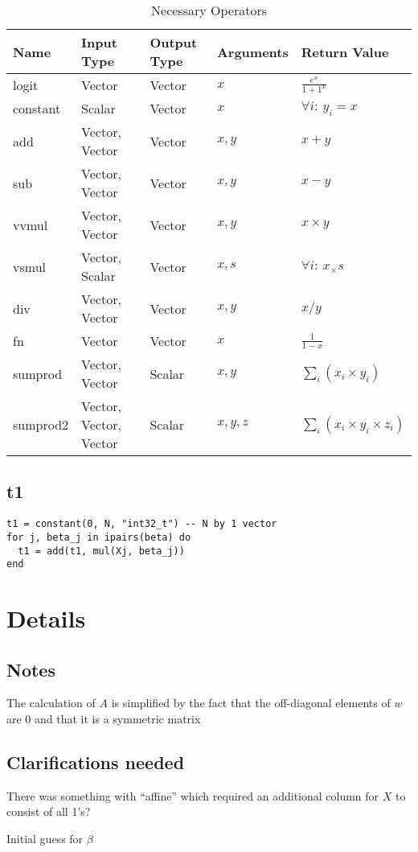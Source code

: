 \documentclass[12pt,timesnewroman,letterpaper]{article}
\begin{document}
\begin{table}[hb]
\centering
\begin{tabular}{|l|l|l|l|l|} \hline \hline
  {\bf Name} & {\bf Input Type} & {\bf Output Type} & {\bf Arguments} & {\bf Return Value} \\ \hline \hline
  logit & Vector & Vector & \(x\) & \(\frac{e^x}{1 + 1^x}\) \\ \hline
  constant & Scalar & Vector & \(x\) & \(\forall i:~ y_i = x \) \\ \hline
  add & Vector, Vector & Vector & \(x, y\) & \(x + y \)  \\ \hline
  sub & Vector, Vector & Vector & \(x, y\) & \(x - y \)  \\ \hline
  vvmul & Vector, Vector & Vector & \(x, y\) & \(x \times y \)  \\ \hline
  vsmul & Vector, Scalar & Vector & \(x, s\) & \(\forall i:~x_ \times s \)  \\ \hline
  div & Vector, Vector & Vector & \(x, y\) & \(x / y \)  \\ \hline
  fn & Vector & Vector & \(x\) & \(\frac{1}{1 - x}\) \\ \hline
  sumprod & Vector, Vector & Scalar & \(x, y\) & \(\sum_i (x_i \times y_i)\) \\ \hline
  sumprod2 & Vector, Vector, Vector & Scalar & \(x, y, z\) & \(\sum_i (x_i \times y_i \times z_i)\) \\ \hline
\hline
\end{tabular}
\caption{Necessary Operators}
\label{tbl_custom_ops}
\end{table}

\subsection{t1}
\label{t1}

\begin{verbatim}
t1 = constant(0, N, "int32_t") -- N by 1 vector 
for j, beta_j in ipairs(beta) do
  t1 = add(t1, mul(Xj, beta_j)) 
end
\end{verbatim}

\section{Details}

\subsection{Notes}

\be
\item The calculation of \(A\) is simplified by the fact that the off-diagonal
  elements of \(w\) are 0 and that it is a symmetric matrix
\ee
\subsection{Clarifications needed}

\be
\item 
There was something with ``affine'' which required an additional column for
\(X\) to consist of all 1's? \TBC
\item Initial guess for \(\beta\)
\ee
\end{document}
